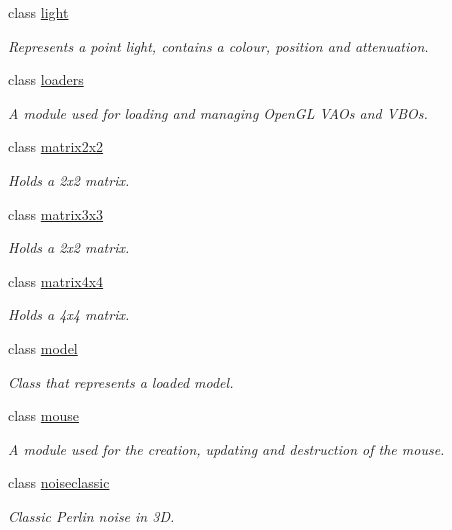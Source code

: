 \begin{DoxyCompactItemize}
class \hyperlink{classflounder_1_1light}{light}
\begin{DoxyCompactList}\small\item\em Represents a point light, contains a colour, position and attenuation. \end{DoxyCompactList}\item 
class \hyperlink{classflounder_1_1loaders}{loaders}
\begin{DoxyCompactList}\small\item\em A module used for loading and managing Open\+GL V\+AO\textquotesingle{}s and V\+BO\textquotesingle{}s. \end{DoxyCompactList}\item 
class \hyperlink{classflounder_1_1matrix2x2}{matrix2x2}
\begin{DoxyCompactList}\small\item\em Holds a 2x2 matrix. \end{DoxyCompactList}\item 
class \hyperlink{classflounder_1_1matrix3x3}{matrix3x3}
\begin{DoxyCompactList}\small\item\em Holds a 2x2 matrix. \end{DoxyCompactList}\item 
class \hyperlink{classflounder_1_1matrix4x4}{matrix4x4}
\begin{DoxyCompactList}\small\item\em Holds a 4x4 matrix. \end{DoxyCompactList}\item 
class \hyperlink{classflounder_1_1model}{model}
\begin{DoxyCompactList}\small\item\em Class that represents a loaded model. \end{DoxyCompactList}\item 
class \hyperlink{classflounder_1_1mouse}{mouse}
\begin{DoxyCompactList}\small\item\em A module used for the creation, updating and destruction of the mouse. \end{DoxyCompactList}\item 
class \hyperlink{classflounder_1_1noiseclassic}{noiseclassic}
\begin{DoxyCompactList}\small\item\em Classic Perlin noise in 3D. \end{DoxyCompactList}\item 

\end{DoxyCompactItemize}
